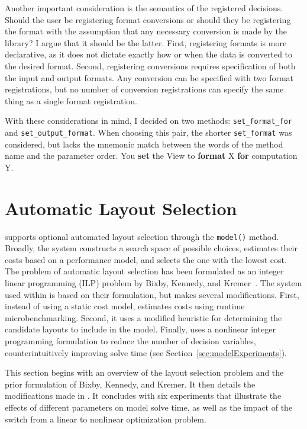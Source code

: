 Another important consideration is the semantics of the registered decisions. 
Should the user be registering format conversions or should they be registering the format with the assumption that any necessary conversion is made by the library?
I argue that it should be the latter.
First, registering formats is more declarative, as it does not dictate exactly how or when the data is converted to the desired format.
Second, registering conversions requires specification of both the input and output formats. 
Any conversion can be specified with two format registrations, but no number of conversion registrations can specify the same thing as a single format registration.

With these considerations in mind, I decided on two methods: \verb.set_format_for. and \verb.set_output_format..
When choosing this pair, the shorter \verb.set_format. was considered, but lacks the mnemonic match between the words of the method name and the parameter order. You \textbf{set} the View to \textbf{format} X \textbf{for} computation Y. 


\section{Automatic Layout Selection}

\FormatDecisions{} supports optional automated layout selection through the \verb.model(). method.
Broadly, the system constructs a search space of possible choices, estimates their costs based on a performance model, and selects the one with the lowest cost.
The problem of automatic layout selection has been formulated as an integer linear programming (ILP) problem by Bixby, Kennedy, and Kremer~\cite{bixby1994automatic}.
The system used within \FormatDecisions{} is based on their formulation, but makes several modifications.
First, instead of using a static cost model, \FormatDecisions{} estimates costs using runtime microbenchmarking.
Second, it uses a modified heuristic for determining the candidate layouts to include in the model.
Finally, \FormatDecisions{} uses a nonlinear integer programming formulation to reduce the number of decision variables, counterintuitively improving solve time (see Section~\ref{sec:modelExperiments}).

This section begins with an overview of the layout selection problem and the prior formulation of Bixby, Kennedy, and Kremer.
It then details the modifications made in \FormatDecisions{}.
It concludes with six experiments that illustrate the effects of different parameters on model solve time, as well as the impact of the switch from a linear to nonlinear optimization problem.

